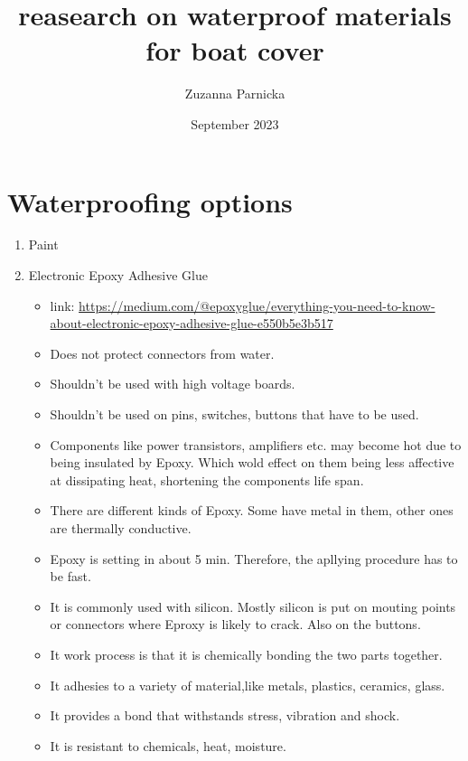 \documentclass{article}[10pt]
\title{reasearch on waterproof materials for boat cover}
\author{Zuzanna Parnicka}
\date{September 2023}
\begin{document}
\renewcommand{\labelenumii}{\arabic{enumi}.\arabic{enumii}}
\renewcommand{\labelenumiii}{\arabic{enumi}.\arabic{enumii}.\arabic{enumiii}}
\renewcommand{\labelenumiv}{\arabic{enumi}.\arabic{enumii}.\arabic{enumiii}.\arabic{enumiv}}

\maketitle
\section{Waterproofing options}

\begin{enumerate}
    \item Paint
    \item Electronic Epoxy Adhesive Glue
        \begin{itemize}
            \item link: \url{https://medium.com/@epoxyglue/everything-you-need-to-know-about-electronic-epoxy-adhesive-glue-e550b5e3b517}
            \item Does not protect connectors from water.
            \item Shouldn't be used with high voltage boards.
            \item Shouldn't be used on pins, switches, buttons that have to be used.
            \item Components like power transistors, amplifiers etc. may become hot due to being insulated by Epoxy. Which wold effect on them being less affective at dissipating heat, shortening the components life span.
            \item There are different kinds of Epoxy. Some have metal in them, other ones are thermally conductive.
            \item Epoxy is setting in about 5 min. Therefore, the apllying procedure has to be fast.
            \item It is commonly used with silicon. Mostly silicon is put on mouting points or connectors where Eproxy is likely to crack. Also on the buttons.
            \item It work process is that it is chemically bonding the two parts together. 
            \item It adhesies to a variety of material,like metals, plastics, ceramics, glass.
            \item It provides a bond that withstands stress, vibration and shock.
            \item It is resistant to chemicals, heat, moisture.

\end{itemize}
\end{enumerate}
\end{document}
